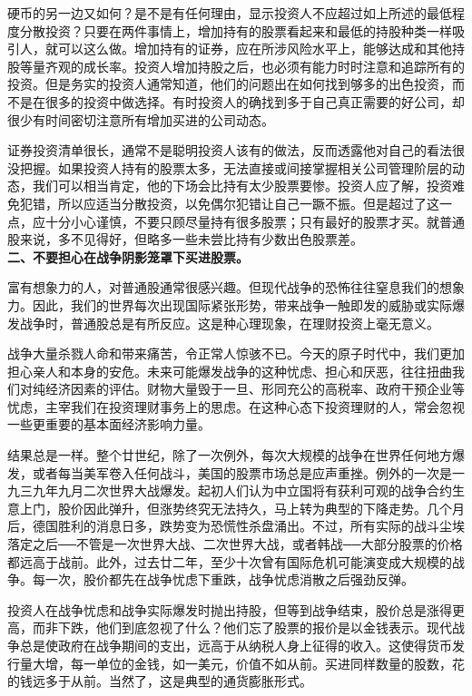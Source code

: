 \documentclass[UTF8,a4paper,zihao=-4,fontset = windows]{ctexart} %
\begin{document}
硬币的另一边又如何？是不是有任何理由，显示投资人不应超过如上所述的最低程度分散投资？只要在两件事情上，增加持有的股票看起来和最低的持股种类一样吸引人，就可以这么做。增加持有的证券，应在所涉风险水平上，能够达成和其他持股等量齐观的成长率。投资人增加持股之后，也必须有能力时时注意和追踪所有的投资。但是务实的投资人通常知道，他们的问题出在如何找到够多的出色投资，而不是在很多的投资中做选择。有时投资人的确找到多于自己真正需要的好公司，却很少有时间密切注意所有增加买进的公司动态。

证券投资清单很长，通常不是聪明投资人该有的做法，反而透露他对自己的看法很没把握。如果投资人持有的股票太多，无法直接或间接掌握相关公司管理阶层的动态，我们可以相当肯定，他的下场会比持有太少股票要惨。投资人应了解，投资难免犯错，所以应适当分散投资，以免偶尔犯错让自己一蹶不振。但是超过了这一点，应十分小心谨慎，不要只顾尽量持有很多股票；只有最好的股票才买。就普通股来说，多不见得好，但略多一些未尝比持有少数出色股票差。
\\

\textbf{二、不要担心在战争阴影笼罩下买进股票。}


富有想象力的人，对普通股通常很感兴趣。但现代战争的恐怖往往窒息我们的想象力。因此，我们的世界每次出现国际紧张形势，带来战争一触即发的威胁或实际爆发战争时，普通股总是有所反应。这是种心理现象，在理财投资上毫无意义。

战争大量杀戮人命和带来痛苦，令正常人惊骇不已。今天的原子时代中，我们更加担心亲人和本身的安危。未来可能爆发战争的这种忧虑、担心和厌恶，往往扭曲我们对纯经济因素的评估。财物大量毁于一旦、形同充公的高税率、政府干预企业等忧虑，主宰我们在投资理财事务上的思虑。在这种心态下投资理财的人，常会忽视一些更重要的基本面经济影响力量。

结果总是一样。整个廿世纪，除了一次例外，每次大规模的战争在世界任何地方爆发，或者每当美军卷入任何战斗，美国的股票市场总是应声重挫。例外的一次是一九三九年九月二次世界大战爆发。起初人们认为中立国将有获利可观的战争合约生意上门，股价因此弹升，但涨势终究无法持久，马上转为典型的下降走势。几个月后，德国胜利的消息日多，跌势变为恐慌性杀盘涌出。不过，所有实际的战斗尘埃落定之后──不管是一次世界大战、二次世界大战，或者韩战──大部分股票的价格都远高于战前。此外，过去廿二年，至少十次曾有国际危机可能演变成大规模的战争。每一次，股价都先在战争忧虑下重跌，战争忧虑消散之后强劲反弹。

投资人在战争忧虑和战争实际爆发时抛出持股，但等到战争结束，股价总是涨得更高，而非下跌，他们到底忽视了什么？他们忘了股票的报价是以金钱表示。现代战争总是使政府在战争期间的支出，远高于从纳税人身上征得的收入。这使得货币发行量大增，每一单位的金钱，如一美元，价值不如从前。买进同样数量的股数，花的钱远多于从前。当然了，这是典型的通货膨胀形式。
\end{document}
